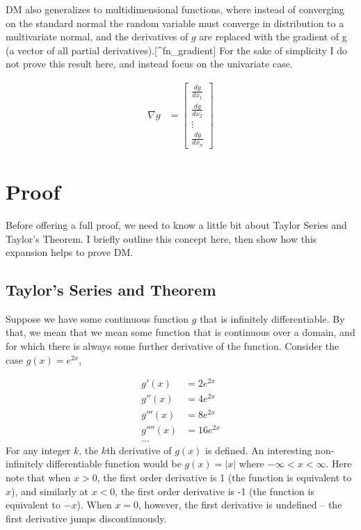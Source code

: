 \documentclass[
]{book}
\begin{document}
DM also generalizes to multidimensional functions, where instead of converging on the standard normal the random variable must converge in distribution to a multivariate normal, and the derivatives of \(g\) are replaced with the gradient of g (a vector of all partial derivatives).{[}\^{}fn\_gradient{]} For the sake of simplicity I do not prove this result here, and instead focus on the univariate case.

\[ 
   \begin{aligned}
    \nabla g &= \begin{bmatrix}
           \frac{dg}{dx_1} \\
           \frac{dg}{dx_2} \\
           \vdots \\
           \frac{dg}{dx_n}
         \end{bmatrix}
  \end{aligned}
   \]

\hypertarget{proof_dm}{%
\section{Proof}\label{proof_dm}}

Before offering a full proof, we need to know a little bit about Taylor Series and Taylor's Theorem. I briefly outline this concept here, then show how this expansion helps to prove DM.

\hypertarget{taylors-series-and-theorem}{%
\subsection{Taylor's Series and Theorem}\label{taylors-series-and-theorem}}

Suppose we have some continuous function \(g\) that is infinitely differentiable. By that, we mean that we mean some function that is continuous over a domain, and for which there is always some further derivative of the function. Consider the case \(g(x) = e^{2x}\),

\[
\begin{aligned}
g'(x) &= 2e^{2x} \\
g''(x) &= 4e^{2x} \\
g'''(x) &= 8e^{2x} \\
g''''(x) &= 16e^{2x} \\
...
\end{aligned}
\]
For any integer \(k\), the \(k\)th derivative of \(g(x)\) is defined. An interesting non-infinitely differentiable function would be \(g(x) = |x|\) where \(-\infty < x < \infty\). Here note that when \(x > 0\), the first order derivative is 1 (the function is equivalent to \(x\)), and similarly at \(x <0\), the first order derivative is -1 (the function is equivalent to \(-x\)). When \(x = 0\), however, the first derivative is undefined -- the first derivative jumps discontinuously.
\end{document}
